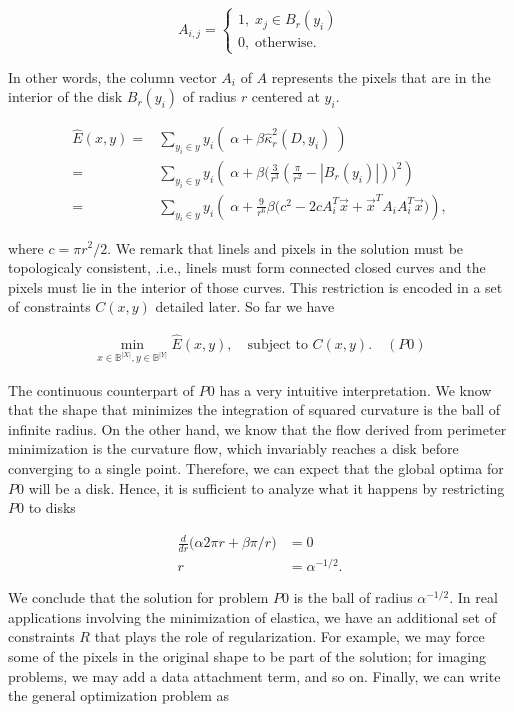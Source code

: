 \[
	A_{i,j} = \left\{ \begin{array}{ll}
		1,\; x_j \in B_{r}(y_i)\\
		0,\; \text{otherwise}.
	\end{array}\right.
\]

In other words, the column vector $A_i$ of $A$ represents the pixels that are in the interior of  the disk $B_{r}(y_i)$ of radius $r$ centered at $y_i$. 


\begin{align}
	\hat{E}(x,y) =& \sum_{y_i \in y}{ y_i \left(\; \alpha + \beta \hat{\kappa}_{r}^2(D,y_i) \; \right)}\\\nonumber
			   =& \sum_{y_i \in y}{ y_i \left(\; \alpha  + \beta \big( \frac{3}{r^3}(\frac{\pi}{r^2} - |B_r(y_i)|)\big)^2\right)}\\\nonumber
			   =& \sum_{y_i \in y}{ y_i \left(\; \alpha + \frac{9}{r^6}\beta \big(c^2 - 2cA_i^T\vec{x} + \vec{x}^TA_iA_i^T\vec{x}\big)\right)},			   
	\end{align}
	
where $c =  \pi r^2/2$. We remark that linels and pixels in the solution must be topologicaly consistent, .i.e., linels must form connected closed curves and the pixels must lie in the interior of those curves. This restriction is encoded in a set of constraints $C(x,y)$ detailed later. So far we have

\begin{align*}
	\min_{x \in \mathbb{B}^{|X|}, y \in \mathbb{B}^{|Y|}}{\hat{E}(x,y)}, \quad \text{subject to } C(x,y). \quad (P0)
\end{align*}

The continuous counterpart of $P0$ has a very intuitive interpretation. We know that the shape that minimizes the integration of squared curvature is the ball of infinite radius. On the other hand, we know that the flow derived from perimeter minimization is the curvature flow, which invariably reaches a disk before converging to a single point. Therefore, we can expect that the global optima for $P0$ will be a disk. Hence, it is sufficient to analyze what it happens by restricting $P0$ to disks

\begin{align*}
	\frac{d}{dr}\big( \alpha 2\pi r + \beta \pi/r \big) &= 0\\
	r &= \alpha^{-1/2}.
\end{align*}  

We conclude that the solution for problem $P0$ is the ball of radius $\alpha^{-1/2}$. In real applications involving the minimization of elastica, we have an additional set of constraints $R$ that plays the role of regularization. For example, we may force some of the pixels in the original shape to be part of the solution; for imaging problems, we may add a data attachment term, and so on. Finally, we can write the general optimization problem as

